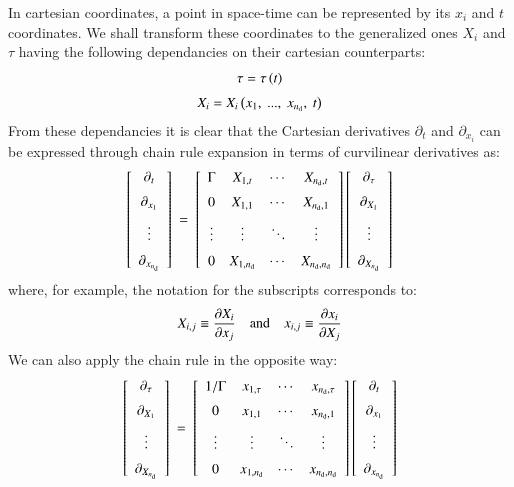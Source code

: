 \documentclass{warpdoc}
\newcommand{\alb}{\vspace{0.2cm}\\} %
\newcommand{\nd}{{{n}_{\rm d}}}
\begin{document}
In cartesian coordinates, a point in space-time
can be represented by its $x_i$ and $t$ coordinates.
We shall transform these coordinates to the generalized
ones $X_i$ and $\tau$ having the following dependancies
on their cartesian counterparts:
%
\begin{equation}
 \begin{array}{c}
   \tau=\tau \left( t \right) \alb
   X_i=X_i \left( x_1,~...,~x_\nd,~t \right)
 \end{array}
\end{equation}
%
From these dependancies it is clear that the Cartesian
derivatives $\partial_t$ and $\partial_{x_i}$ can
be expressed through chain rule expansion
in terms of curvilinear derivatives as:
%
\begin{equation}
  \left[
    \begin{array}{c}
       \partial_t \alb
       \partial_{x_1} \alb
       \vdots \alb
       \partial_{x_\nd}
    \end{array}
  \right]
  ~=~
  \left[
    \begin{array}{cccc}
       \Gamma & X_{1,t} & \cdots & X_{\nd,t} \alb
       0      & X_{1,1} & \cdots & X_{\nd,1} \alb
       \vdots & \vdots  & \ddots & \vdots \alb
       0      & X_{1,\nd} & \cdots & X_{\nd,\nd}
    \end{array}
  \right]
  \left[
    \begin{array}{c}
       \partial_\tau \alb
       \partial_{X_1} \alb
       \vdots \alb
       \partial_{X_\nd}
    \end{array}
  \right]
  \label{eqn:chainrule}
\end{equation}
%
where, for example, the notation for the subscripts corresponds to:
%
\begin{displaymath}
  X_{i,j} \equiv \frac{\partial X_i}{\partial x_j}  {\rm ~~~~and~~~~}
x_{i,j} \equiv \frac{\partial x_i}{\partial X_j}
\end{displaymath}
%
We can also apply the chain rule in the opposite way:
%
\begin{equation}
  \left[
    \begin{array}{c}
       \partial_\tau \alb
       \partial_{X_1} \alb
       \vdots \alb
       \partial_{X_\nd}
    \end{array}
  \right]
  ~=~
  \left[
    \begin{array}{cccc}
       1/\Gamma & x_{1,\tau} & \cdots & x_{\nd,\tau} \alb
       0        & x_{1,1}    & \cdots & x_{\nd,1} \alb
       \vdots   & \vdots     & \ddots & \vdots \alb
       0        & x_{1,\nd} & \cdots & x_{\nd,\nd}
    \end{array}
  \right]
  \left[
    \begin{array}{c}
       \partial_t \alb
       \partial_{x_1} \alb
       \vdots \alb
       \partial_{x_\nd}
    \end{array}
  \right]
  \label{eqn:chainrule-inv2}
\end{equation}
\end{document}
